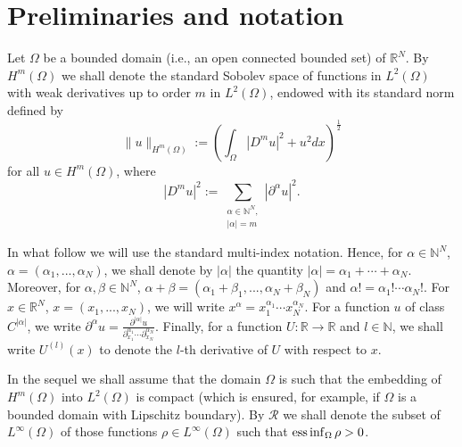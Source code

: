 \documentclass[11pt,a4paper]{amsart}
\numberwithin{equation}{section}
\begin{document}


\section{Preliminaries and notation}\label{preliminaries}


Let $\Omega$ be a bounded domain (i.e., an open connected bounded set) of $\mathbb R^N$. By $H^m(\Omega)$ we shall denote the standard  Sobolev space of functions in $L^2(\Omega)$ with weak derivatives up to order $m$ in $L^2(\Omega)$, endowed with its standard norm defined by
\begin{equation*}%
\|u\|_{H^m(\Omega)}:=\left(\int_{\Omega}|D^mu|^2+u^2 dx\right)^\frac{1}{2}
\end{equation*}
for all $u\in H^m(\Omega)$, where 
$$
|D^mu|^2:=\sum_{\substack{\alpha\in\mathbb N^N,\\|\alpha|= m}}|\partial^{\alpha}u|^2.
$$ 

In what follow we will use the standard multi-index notation. Hence, for $\alpha\in\mathbb N^N$, $\alpha=(\alpha_1,...,\alpha_N)$, we shall denote by $|\alpha|$ the quantity $|\alpha|=\alpha_1+\cdots+\alpha_N$. Moreover, for $\alpha,\beta\in\mathbb N^N$, $\alpha+\beta=(\alpha_1+\beta_1,...,\alpha_N+\beta_N)$ and $\alpha!=\alpha_1!\cdots\alpha_N!$. For $x\in\mathbb R^N$, $x=(x_1,...,x_N)$, we will write $x^{\alpha}=x_1^{\alpha_1}\cdots x_N^{\alpha_N}$. For a function $u$ of class $C^{|\alpha|}$, we write $\partial^{\alpha}u=\frac{\partial^{|\alpha|}u}{\partial_{x_1}^{\alpha_1}\cdots\partial_{x_N}^{\alpha_N}}$. Finally, for a function $U:\mathbb R\rightarrow\mathbb R$ and $l\in\mathbb N$, we shall write $U^{(l)}(x)$ to denote the $l$-th derivative of $U$ with respect to $x$.


In the sequel we shall assume that the domain $\Omega$ is such that the embedding of $H^m(\Omega)$ into $L^2(\Omega)$ is compact (which is ensured, for example, if $\Omega$ is a bounded domain with Lipschitz boundary). By $\mathcal R$ we shall denote the subset of $L^{\infty}(\Omega)$ of those functions $\rho\in L^{\infty}(\Omega)$ such that ${\rm ess}\inf_{\Omega}\rho>0$. 
\end{document}
